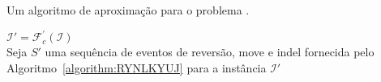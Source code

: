 \begin{algorithm}[!tbh]
  \caption{Um algoritmo de aproximação para o problema \SbFIRMI{}.\label{algorithm:TAJJYPTG}}
  $\mathcal{I}' = \mathcal{F}_{c}^{'}(\mathcal{I})$ \\
  Seja $S'$ uma sequência de eventos de reversão, move e indel fornecida pelo Algoritmo~\ref{algorithm:RYNLKYUJ} para a instância $\mathcal{I}'$ \\
\end{algorithm}